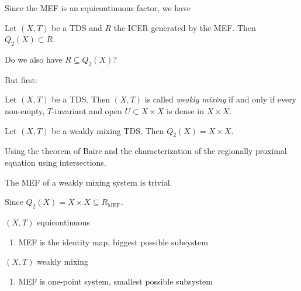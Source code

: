 \begin{frame}
  Since the MEF is an equicontinuous factor, we have
  \begin{corollary}
    Let $(X, T)$ be a TDS and $R$ the ICER generated by the MEF.
    Then $Q_2(X) \subset R$.
  \end{corollary}
  Do we also have $R \subseteq Q_2(X)$?
\end{frame}

\begin{frame}
  But first:
  \begin{definition}
    Let $(X,T)$ be a TDS. Then $(X,T)$ is called \emph{weakly mixing} if and only if every non-empty, $T$-invariant and open $U\subset X \times X$ is dense in $X \times X$.
  \end{definition}
  \pause
  \begin{proposition}
    Let $(X,T)$ be a weakly mixing TDS. Then $Q_2(X) = X \times X$.
  \end{proposition}
  Using the theorem of Baire and the characterization of the
  regionally proximal equation using intersections.
  \pause
  \begin{corollary}
    The MEF of a weakly mixing system is trivial.
  \end{corollary}
  Since $Q_2(X) = X \times X \subseteq R_\text{MEF}$.
\end{frame}

\begin{frame}
  \begin{minipage}{0.45\textwidth}
    \begin{center}
      $(X, T)$ equicontinuous
      \vspace{2em}
      \begin{enumerate}
        \item MEF is the identity map, biggest possible subsystem
      \end{enumerate}
    \end{center}
  \end{minipage}%
  \begin{minipage}{0.45\textwidth}
    \begin{center}
      $(X, T)$ weakly mixing
      \vspace{2em}
      \begin{enumerate}
        \item MEF is one-point system, smallest possible subsystem
      \end{enumerate}
    \end{center}
  \end{minipage}
\end{frame}

